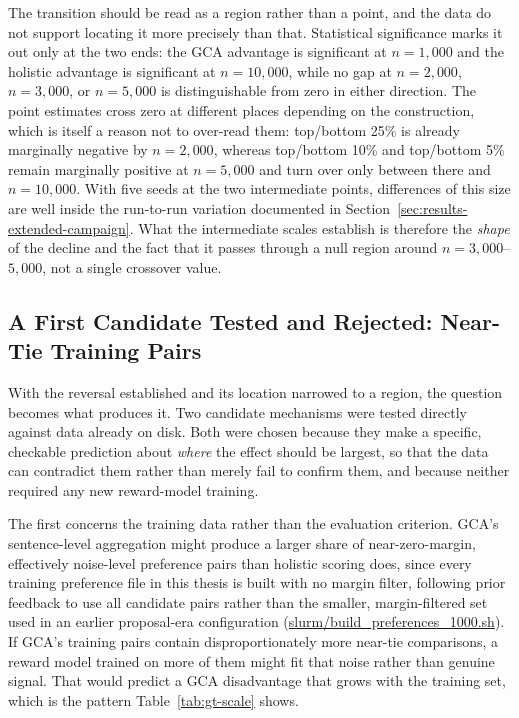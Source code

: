 The transition should be read as a region rather than a point, and the data
do not support locating it more precisely than that. Statistical
significance marks it out only at the two ends: the GCA advantage is
significant at $n=1{,}000$ and the holistic advantage is significant at
$n=10{,}000$, while no gap at $n=2{,}000$, $n=3{,}000$, or $n=5{,}000$ is
distinguishable from zero in either direction. The point estimates cross
zero at different places depending on the construction, which is itself a
reason not to over-read them: top/bottom 25\% is already marginally
negative by $n=2{,}000$, whereas top/bottom 10\% and top/bottom 5\% remain
marginally positive at $n=5{,}000$ and turn over only between there and
$n=10{,}000$. With five seeds at the two intermediate points, differences
of this size are well inside the run-to-run variation documented in
Section~\ref{sec:results-extended-campaign}. What the intermediate scales
establish is therefore the \emph{shape} of the decline and the fact that it
passes through a null region around $n=3{,}000$--$5{,}000$, not a single
crossover value.

\subsection{A First Candidate Tested and Rejected: Near-Tie Training Pairs}
\label{sec:results-gt-margin}

With the reversal established and its location narrowed to a region, the
question becomes what produces it. Two candidate mechanisms were tested
directly against data already on disk. Both were chosen because they make a
specific, checkable prediction about \emph{where} the effect should be
largest, so that the data can contradict them rather than merely fail to
confirm them, and because neither required any new reward-model training.

The first concerns the training data rather than the evaluation criterion.
GCA's sentence-level aggregation might produce a larger share of
near-zero-margin, effectively noise-level preference pairs than holistic
scoring does, since every training preference file in this thesis is built
with no margin filter, following prior feedback to use all candidate pairs
rather than the smaller, margin-filtered set used in an earlier
proposal-era configuration (\url{slurm/build_preferences_1000.sh}). If
GCA's training pairs contain disproportionately more near-tie comparisons,
a reward model trained on more of them might fit that noise rather than
genuine signal. That would predict a GCA disadvantage that grows with the
training set, which is the pattern
Table~\ref{tab:gt-scale} shows.

